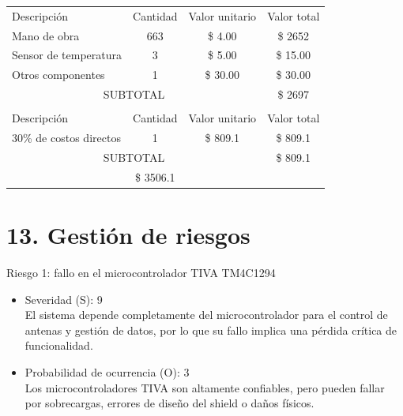 \documentclass[
11pt, %
]{charter}
\begin{document}
\begin{table}[htpb]
\centering
\begin{tabularx}{\linewidth}{@{}|X|c|r|r|@{}}
\hline
\rowcolor[HTML]{C0C0C0} 
\multicolumn{4}{|c|}{\cellcolor[HTML]{C0C0C0}COSTOS DIRECTOS} \\ \hline
\rowcolor[HTML]{C0C0C0} 
Descripción &
  \multicolumn{1}{c|}{\cellcolor[HTML]{C0C0C0}Cantidad} &
  \multicolumn{1}{c|}{\cellcolor[HTML]{C0C0C0}Valor unitario} &
  \multicolumn{1}{c|}{\cellcolor[HTML]{C0C0C0}Valor total} \\ \hline
Mano de obra  &
  \multicolumn{1}{c|}{663} & 
  \multicolumn{1}{c|}{\$ 4.00} &
  \multicolumn{1}{c|}{\$ 2652} \\ \hline
Sensor de temperatura &
  \multicolumn{1}{c|}{3} &
  \multicolumn{1}{c|}{\$ 5.00} &
  \multicolumn{1}{c|}{\$ 15.00} \\ \hline
Otros componentes &
\multicolumn{1}{c|}{1} &
   \multicolumn{1}{c|}{\$ 30.00} &
   \multicolumn{1}{c|}{\$ 30.00} \\ \hline
\multicolumn{3}{|c|}{SUBTOTAL} &
  \multicolumn{1}{c|}{\$ 2697} \\ \hline
\rowcolor[HTML]{C0C0C0} 
\multicolumn{4}{|c|}{\cellcolor[HTML]{C0C0C0}COSTOS INDIRECTOS} \\ \hline
\rowcolor[HTML]{C0C0C0} 
Descripción &
  \multicolumn{1}{c|}{\cellcolor[HTML]{C0C0C0}Cantidad} &
  \multicolumn{1}{c|}{\cellcolor[HTML]{C0C0C0}Valor unitario} &
  \multicolumn{1}{c|}{\cellcolor[HTML]{C0C0C0}Valor total} \\ \hline
30\% de costos directos  &
\multicolumn{1}{c|}{1} &
\multicolumn{1}{c|}{\$ 809.1} &
\multicolumn{1}{c|}{\$ 809.1} \\ \hline

\multicolumn{3}{|c|}{SUBTOTAL} &
\multicolumn{1}{c|}{\$ 809.1} \\ \hline
\rowcolor[HTML]{C0C0C0}
\multicolumn{3}{|c|}{TOTAL} &
\multicolumn{1}{c|}{\$ 3506.1} \\ \hline
\end{tabularx}%
\end{table}


\section{13. Gestión de riesgos}
\label{sec:riesgos}

 
Riesgo 1: fallo en el microcontrolador TIVA TM4C1294
\begin{itemize}
	\item Severidad (S): 9 \\ 
	El sistema depende completamente del microcontrolador para el control de antenas y gestión de datos, por lo que su fallo implica una pérdida crítica de funcionalidad.
	\item Probabilidad de ocurrencia (O): 3 \\
	Los microcontroladores TIVA son altamente confiables, pero pueden fallar por sobrecargas, errores de diseño del shield o daños físicos.
\end{itemize}   
\end{document}
